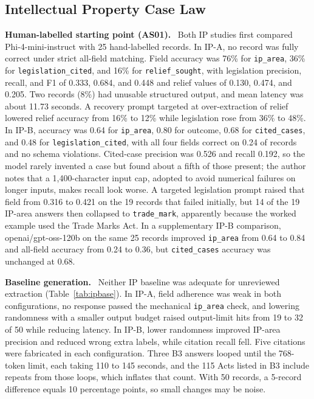 \documentclass[10pt,letterpaper]{article}
\newcommand{\para}[1]{\textbf{#1}\ }
\newcommand{\code}[1]{\texttt{\small #1}}
\begin{document}
\subsection{Intellectual Property Case Law}
\para{Human-labelled starting point (AS01).} Both IP studies first compared Phi-4-mini-instruct with 25 hand-labelled records. In IP-A, no record was fully correct under strict all-field matching. Field accuracy was 76\% for \code{ip\_area}, 36\% for \code{legislation\_cited}, and 16\% for \code{relief\_sought}, with legislation precision, recall, and F1 of 0.333, 0.684, and 0.448 and relief values of 0.130, 0.474, and 0.205. Two records (8\%) had unusable structured output, and mean latency was about 11.73 seconds. A recovery prompt targeted at over-extraction of relief lowered relief accuracy from 16\% to 12\% while legislation rose from 36\% to 48\%. In IP-B, accuracy was 0.64 for \code{ip\_area}, 0.80 for outcome, 0.68 for \code{cited\_cases}, and 0.48 for \code{legislation\_cited}, with all four fields correct on 0.24 of records and no schema violations. Cited-case precision was 0.526 and recall 0.192, so the model rarely invented a case but found about a fifth of those present; the author notes that a 1,400-character input cap, adopted to avoid numerical failures on longer inputs, makes recall look worse. A targeted legislation prompt raised that field from 0.316 to 0.421 on the 19 records that failed initially, but 14 of the 19 IP-area answers then collapsed to \code{trade\_mark}, apparently because the worked example used the Trade Marks Act. In a supplementary IP-B comparison, openai/gpt-oss-120b on the same 25 records improved \code{ip\_area} from 0.64 to 0.84 and all-field accuracy from 0.24 to 0.36, but \code{cited\_cases} accuracy was unchanged at 0.68.

\para{Baseline generation.} Neither IP baseline was adequate for unreviewed extraction (Table~\ref{tab:ipbase}). In IP-A, field adherence was weak in both configurations, no response passed the mechanical \code{ip\_area} check, and lowering randomness with a smaller output budget raised output-limit hits from 19 to 32 of 50 while reducing latency. In IP-B, lower randomness improved IP-area precision and reduced wrong extra labels, while citation recall fell. Five citations were fabricated in each configuration. Three B3 answers looped until the 768-token limit, each taking 110 to 145 seconds, and the 115 Acts listed in B3 include repeats from those loops, which inflates that count. With 50 records, a 5-record difference equals 10 percentage points, so small changes may be noise.
\end{document}
